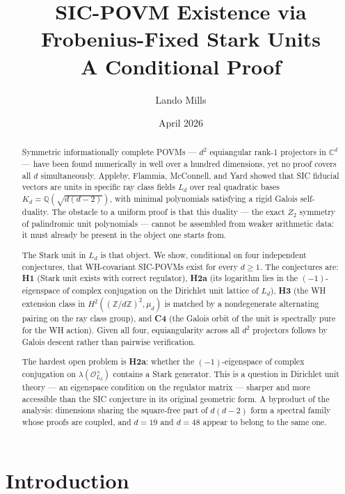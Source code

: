 \documentclass[12pt]{article}
\title{%
  \textbf{SIC-POVM Existence via Frobenius-Fixed Stark Units}\\[6pt]
  \large A Conditional Proof
}
\author{Lando Mills}
\date{April 2026}
\theoremstyle{plain}
\theoremstyle{definition}
\theoremstyle{remark}
\newcommand{\OO}{\mathcal{O}}
\newcommand{\bQ}{\mathbb{Q}}
\newcommand{\bC}{\mathbb{C}}
\newcommand{\bZ}{\mathbb{Z}}
\begin{document}
\maketitle

\begin{abstract}
Symmetric informationally complete POVMs — $d^2$ equiangular rank-1 projectors in $\bC^d$ — have been found numerically in well over a hundred dimensions, yet no proof covers all $d$ simultaneously. Appleby, Flammia, McConnell, and Yard showed that SIC fiducial vectors are units in specific ray class fields $L_d$ over real quadratic bases $K_d = \bQ(\sqrt{d(d-2)})$, with minimal polynomials satisfying a rigid Galois self-duality. The obstacle to a uniform proof is that this duality — the exact $Z_2$ symmetry of palindromic unit polynomials — cannot be assembled from weaker arithmetic data: it must already be present in the object one starts from.

The Stark unit in $L_d$ is that object. We show, conditional on four independent conjectures, that WH-covariant SIC-POVMs exist for every $d \geq 1$. The conjectures are: \textbf{H1} (Stark unit exists with correct regulator), \textbf{H2a} (its logarithm lies in the $(-1)$-eigenspace of complex conjugation on the Dirichlet unit lattice of $L_d$), \textbf{H3} (the WH extension class in $H^2((\bZ/d\bZ)^2, \mu_d)$ is matched by a nondegenerate alternating pairing on the ray class group), and \textbf{C4} (the Galois orbit of the unit is spectrally pure for the WH action). Given all four, equiangularity across all $d^2$ projectors follows by Galois descent rather than pairwise verification.

The hardest open problem is \textbf{H2a}: whether the $(-1)$-eigenspace of complex conjugation on $\lambda(\OO_{L_d}^\times)$ contains a Stark generator. This is a question in Dirichlet unit theory — an eigenspace condition on the regulator matrix — sharper and more accessible than the SIC conjecture in its original geometric form. A byproduct of the analysis: dimensions sharing the square-free part of $d(d-2)$ form a spectral family whose proofs are coupled, and $d = 19$ and $d = 48$ appear to belong to the same one.
\end{abstract}

\tableofcontents

\section{Introduction}
\end{document}
